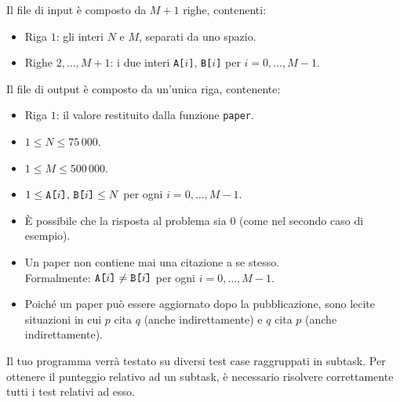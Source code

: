 Il file di input è composto da $M+1$ righe, contenenti:
\begin{itemize}[nolistsep,itemsep=2mm]
\item Riga $1$: gli interi $N$ e $M$, separati da uno spazio.
\item Righe $2,\ldots, M+1$: i due interi \texttt{A[$i$]}, \texttt{B[$i$]} per $i = 0,\ldots, M-1$.
\end{itemize}

Il file di output è composto da un'unica riga, contenente:
\begin{itemize}[nolistsep,itemsep=2mm]
\item Riga $1$: il valore restituito dalla funzione \texttt{paper}.
\end{itemize}



\Constraints

\begin{itemize}[nolistsep, itemsep=2mm]
	\item $1 \le N \le 75\,000$.
        \item $1 \le M \le 500\,000$.
	\item $1 \le \text{\texttt{A[$i$]}, \texttt{B[$i$]}} \le N$ per ogni $i=0,\ldots, M-1$.
        \item È possibile che la risposta al problema sia 0 (come nel secondo caso di esempio).
        \item Un paper non contiene mai una citazione a se stesso. \\ Formalmente: $\text{\texttt{A[$i$]}} \neq \text{\texttt{B[$i$]}}$ per ogni $i=0,\ldots, M-1$.
        \item Poiché un paper può essere aggiornato dopo la pubblicazione, sono lecite situazioni in cui $p$ cita $q$ (anche indirettamente) e $q$ cita $p$ (anche indirettamente).
\end{itemize}



\Scoring

Il tuo programma verrà testato su diversi test case raggruppati in subtask.
Per ottenere il punteggio relativo ad un subtask, è necessario risolvere correttamente tutti i test relativi ad esso.


